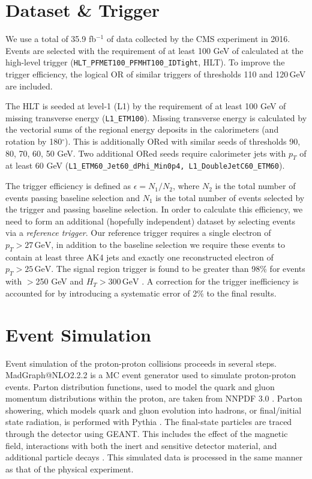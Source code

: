 \section{Dataset \& Trigger}

We use a total of 35.9 fb$^{-1}$ of data collected by the CMS experiment in 2016. Events are selected with the requirement of at least 100 GeV of \ptmiss calculated at the high-level trigger (\texttt{HLT\_PFMET100\_PFMHT100\_IDTight}, HLT). To improve the trigger efficiency, the logical OR of similar triggers of thresholds 110 and 120$\,$GeV are included.

The HLT is seeded at level-1 (L1) by the requirement of at least 100 GeV of missing transverse energy (\texttt{L1\_ETM100}). Missing transverse energy is calculated by the vectorial sums of the regional energy deposits in the calorimeters (and rotation by 180$^{\circ}$). This is additionally ORed with similar seeds of thresholds 90, 80, 70, 60, 50 GeV. Two additional ORed seeds require calorimeter jets with $p_{T}$ of at least 60 GeV (\texttt{L1\_ETM60\_Jet60\_dPhi\_Min0p4, L1\_DoubleJetC60\_ETM60}).

The trigger efficiency is defined as $\epsilon = N_{1}/N_{2}$, where $N_{2}$ is the total number of events passing baseline selection and $N_{1}$ is the total number of events selected by the trigger and passing baseline selection. In order to calculate this efficiency, we need to form an additional (hopefully independent) dataset by selecting events via a \textit{reference trigger}. Our reference trigger requires a single electron of $p_{T}>27\,\textrm{GeV}$, in addition to the baseline selection we require these events to contain at least three AK4 jets and exactly one reconstructed electron of $p_{T}>25\,\textrm{GeV}$. The signal region trigger is found to be greater than 98\% for events with \ptmiss$>$250 GeV and $H_{T}>300\,\textrm{GeV}$ \cite{CMS-SUS-16-033}. A correction for the trigger inefficiency is accounted for by introducing a systematic error of 2\% to the final results.

\section{Event Simulation}

Event simulation of the proton-proton collisions proceeds in several steps. MadGraph@NLO2.2.2 \cite{Alwall:2014hca} is a MC event generator used to simulate proton-proton events. Parton distribution functions, used to model the quark and gluon momentum distributions within the proton, are taken from NNPDF 3.0 \cite{Ball:2014uwa}. Parton showering, which models quark and gluon evolution into hadrons, or final/initial state radiation, is performed with Pythia \cite{pythiacite}. The final-state particles are traced through the detector using GEANT. This includes the effect of the magnetic field, interactions with both the inert and sensitive detector material, and additional particle decays \cite{Agostinelli:2002hh}. This simulated data is processed in the same manner as that of the physical experiment.

